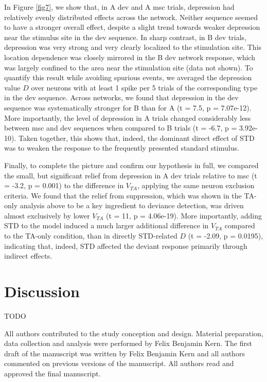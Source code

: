 \documentclass[pdflatex,referee,iicol,sn-basic]{sn-jnl}
\theoremstyle{thmstyleone}%
\theoremstyle{thmstyletwo}%
\theoremstyle{thmstylethree}%
\begin{document}
In Figure \ref{fig7}, we show that, in A dev and A msc trials, depression had relatively evenly distributed effects across the network. Neither sequence seemed to have a stronger overall effect, despite a slight trend towards weaker depression near the stimulus site in the dev sequence. In sharp contrast, in B dev trials, depression was very strong and very clearly localized to the stimulation site. This location dependence was closely mirrored in the B dev network response, which was largely confined to the area near the stimulation site (data not shown). To quantify this result while avoiding spurious events, we averaged the depression value $D$ over neurons with at least 1 spike per 5 trials of the corresponding type in the dev sequence. Across networks, we found that depression in the dev sequence was systematically stronger for B than for A (t = 7.5, p = 7.07e-12). More importantly, the level of depression in A trials changed considerably less between msc and dev sequences when compared to B trials (t = -6.7, p = 3.92e-10). Taken together, this shows that, indeed, the dominant direct effect of STD was to weaken the response to the frequently presented standard stimulus.

Finally, to complete the picture and confirm our hypothesis in full, we compared the small, but significant relief from depression in A dev trials relative to msc (t = -3.2, p = 0.001) to the difference in $V_{TA}$, applying the same neuron exclusion criteria. We found that the relief from suppression, which was shown in the TA-only analysis above to be a key ingredient to deviance detection, was driven almost exclusively by lower $V_{TA}$ (t = 11, p = 4.06e-19). More importantly, adding STD to the model induced a much larger additional difference in $V_{TA}$ compared to the TA-only condition, than in directly STD-related $D$ (t = -2.09, p = 0.0195), indicating that, indeed, STD affected the deviant response primarily through indirect effects.

\section{Discussion}\label{sec-discussion}






\backmatter

TODO

All authors contributed to the study conception and design. Material preparation, data collection and analysis were performed by Felix Benjamin Kern. The first draft of the manuscript was written by Felix Benjamin Kern and all authors commented on previous versions of the manuscript. All authors read and approved the final manuscript.
\end{document}
